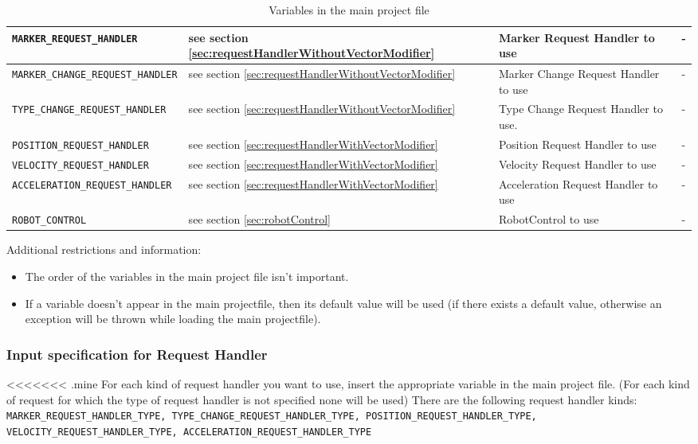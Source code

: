 \begin{sidewaystable}
\begin{tabular}{|l|p{}|p{}|p{}|}
		 \texttt{MARKER\_REQUEST\_HANDLER} &  see section \ref{sec:requestHandlerWithoutVectorModifier} & Marker Request Handler to use & -\\\hline
		
		\texttt{MARKER\_CHANGE\_REQUEST\_HANDLER} &  see section \ref{sec:requestHandlerWithoutVectorModifier} & Marker Change Request Handler to use & -\\\hline
		
		\texttt{TYPE\_CHANGE\_REQUEST\_HANDLER} &  see section \ref{sec:requestHandlerWithoutVectorModifier} & Type Change Request Handler to use. & -\\\hline
		
		\texttt{POSITION\_REQUEST\_HANDLER} &  see section \ref{sec:requestHandlerWithVectorModifier} & Position Request Handler to use & -\\\hline

		\texttt{VELOCITY\_REQUEST\_HANDLER} &  see section \ref{sec:requestHandlerWithVectorModifier} & Velocity Request Handler to use & -\\\hline

		\texttt{ACCELERATION\_REQUEST\_HANDLER} &  see section \ref{sec:requestHandlerWithVectorModifier} & Acceleration Request Handler to use & -\\\hline
		
		\texttt{ROBOT\_CONTROL} &  see section \ref{sec:robotControl} & RobotControl to use & -\\\hline
				
	\end{tabular}
	\caption{Variables in the main project file}\label{tab:mainvars}
\end{sidewaystable}
\thispagestyle{empty}
\clearpage
	
Additional restrictions and information:
\begin{itemize}
	\item The order of the variables in the main project file isn't important.
	\item If a variable doesn't appear in the main projectfile, then its default value will be used (if there exists a default value, otherwise an exception will be thrown while loading the main projectfile).
\end{itemize}



\subsubsection{Input specification for Request Handler}\label{sec:requestHandler}
<<<<<<< .mine
For each kind of request handler you want to use, insert the appropriate variable in the main project file. (For each kind of request for which the type of  request handler is not specified none will be used)
There are the following request handler kinds: \texttt{MARKER\_REQUEST\_HANDLER\_TYPE, TYPE\_CHANGE\_REQUEST\_HANDLER\_TYPE,  POSITION\_REQUEST\_HANDLER\_TYPE, VELOCITY\_REQUEST\_HANDLER\_TYPE, ACCELERATION\_REQUEST\_HANDLER\_TYPE }\\

